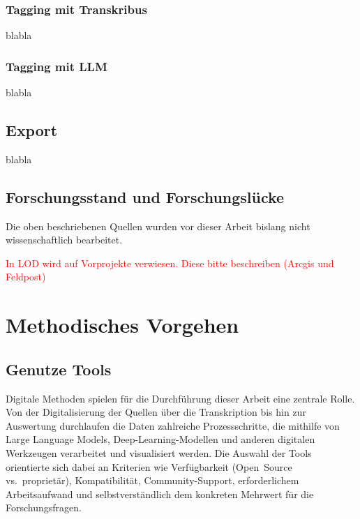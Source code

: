 \documentclass[12pt, a4paper, ngerman, bidi=default]{article}
\begin{document}
\subsubsection{Tagging mit Transkribus}
blabla
\subsubsection{Tagging mit LLM}
blabla
\subsection{Export}
blabla


\subsection{Forschungsstand und Forschungslücke}\label{subsec:forschungsstand}
Die oben beschriebenen Quellen wurden vor dieser Arbeit bislang nicht wissenschaftlich bearbeitet.

\textcolor{red}{In LOD wird auf Vorprojekte verwiesen. Diese bitte beschreiben (Arcgis und Feldpost)}


\section{Methodisches Vorgehen}
\subsection{Genutze Tools}
Digitale Methoden spielen für die Durchführung dieser Arbeit eine zentrale Rolle. Von der Digitalisierung der Quellen
über die Transkription bis hin zur Auswertung durchlaufen die Daten zahlreiche Prozessschritte, die mithilfe von Large 
Language Models, Deep-Learning-Modellen und anderen digitalen Werkzeugen verarbeitet und visualisiert werden. 
Die Auswahl der Tools orientierte sich dabei an Kriterien wie Verfügbarkeit (Open~Source vs.\ proprietär), 
Kompatibilität, Community-Support, erforderlichem Arbeitsaufwand und selbstverständlich dem konkreten Mehrwert für 
die Forschungsfragen.
\end{document}
